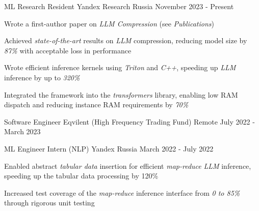 
\begin{cventries}
  \cventry
    {ML Research Resident}
    {Yandex Research}
    {Russia}
    {November 2023 - Present}
    {
      \begin{cvitems}
        \item {Wrote a first-author paper on \textit{LLM Compression} (see \textit{Publications})}
        \item {Achieved \textit{state-of-the-art} results on \textit{LLM} compression, reducing model size by \textit{87\%} with acceptable loss in performance}
        \item {Wrote efficient inference kernels using \textit{Triton} and \textit{C++}, speeding up \textit{LLM} inference by up to \textit{320\%}}
        \item {Integrated the framework into the \textit{transformers} library, enabling low RAM dispatch and reducing instance RAM requirements by \textit{70\%}}
      \end{cvitems}
    }


  \cventry
    {Software Engineer}
    {Eqvilent (High Frequency Trading Fund)}
    {Remote}
    {July 2022 - March 2023}
    {}

  \cventry
    {ML Engineer Intern (NLP)}
    {Yandex}
    {Russia}
    {March 2022 - July 2022}
    {
      \begin{cvitems} %
        \item {Enabled abstract \textit{tabular data} insertion for efficient \textit{map-reduce} \textit{LLM} inference, speeding up the tabular data processing by 120\%}
        \item {Increased test coverage of the \textit{map-reduce} inference interface from \textit{0 to 85\%} through rigorous unit testing}
      \end{cvitems}
    }
    

\end{cventries}
